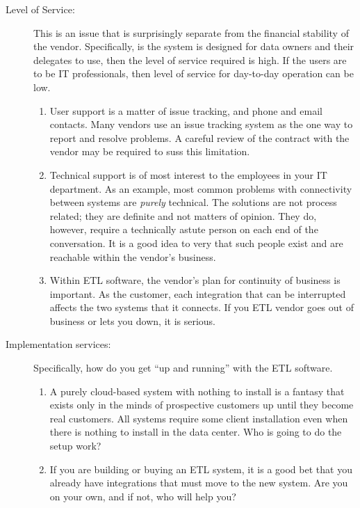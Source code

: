 \documentclass[11pt,letterpaper,twosided]{memoir}
\begin{document}
\begin{description}
\begin{enumerate}
\end{enumerate}

\item[Level of Service:] This is an issue that is surprisingly
separate from the financial stability of the vendor. Specifically,
is the system is designed for data owners and their delegates to
use, then the level of service required is high. If the users are
to be IT professionals, then level of service for day-to-day operation
can be low.

\begin{enumerate}
\item User support is a matter of issue tracking, and phone and
email contacts. Many vendors use an issue tracking system as the
one way to report and resolve problems. A careful review of the
contract with the vendor may be required to suss this limitation.

\item Technical support is of most interest to the employees in
your IT department. As an example, most common problems with
connectivity between systems are \emph{purely} technical. The
solutions are not process related; they are definite and not matters
of opinion. They do, however, require a technically astute person
on each end of the conversation. It is a good idea to very that
such people exist and are reachable within the vendor's business.

\item Within ETL software, the vendor's plan for continuity of
business is important. As the customer, each integration that can
be interrupted affects the two systems that it connects.  If you
ETL vendor goes out of business or lets you down, it is serious.

\end{enumerate}


\item[Implementation services:] Specifically, how do you get ``up
and running'' with the ETL software.

\begin{enumerate}
\item A purely cloud-based system with nothing to install is 
a fantasy that exists only in the minds of prospective customers
up until they become real customers. All systems require some
client installation even when there is nothing to install in the
data center. Who is going to do the setup work?

\item If you are building or buying an ETL system, it is a good
bet that you already have integrations that must move to the new
system. Are you on your own, and if not, who will help you?


\end{enumerate}
\end{description}
\end{document}

